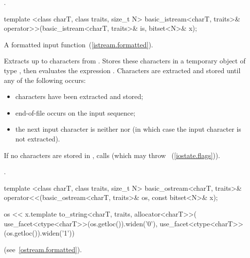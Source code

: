 \begin{itemdescr}
\pnum
\returns
{}.
\end{itemdescr}

%
\begin{itemdecl}
template <class charT, class traits, size_t N>
  basic_istream<charT, traits>&
    operator>>(basic_istream<charT, traits>& is, bitset<N>& x);
\end{itemdecl}

\begin{itemdescr}
\pnum
A formatted input function~(\ref{istream.formatted}).

\pnum
\effects
Extracts up to  characters from .
Stores these characters in a temporary object  of type
,
then evaluates the expression
.
Characters are extracted and stored until any of the following occurs:

\begin{itemize}
\item
{} characters have been extracted and stored;
\item
end-of-file occurs on the input sequence;%
\item
the next input character is neither
nor
(in which case the input character is not extracted).
\end{itemize}

\pnum
If no characters are stored in , calls
(which may throw
~(\ref{iostate.flags})).

\pnum
\returns
{}.
\end{itemdescr}

%
\begin{itemdecl}
template <class charT, class traits, size_t N>
  basic_ostream<charT, traits>&
    operator<<(basic_ostream<charT, traits>& os, const bitset<N>& x);
\end{itemdecl}

\begin{itemdescr}
\pnum
\returns
\begin{codeblock}
os << x.template to_string<charT, traits, allocator<charT>>(
  use_facet<ctype<charT>>(os.getloc()).widen('0'),
  use_facet<ctype<charT>>(os.getloc()).widen('1'))
\end{codeblock}
(see~\ref{ostream.formatted}).
\end{itemdescr}

